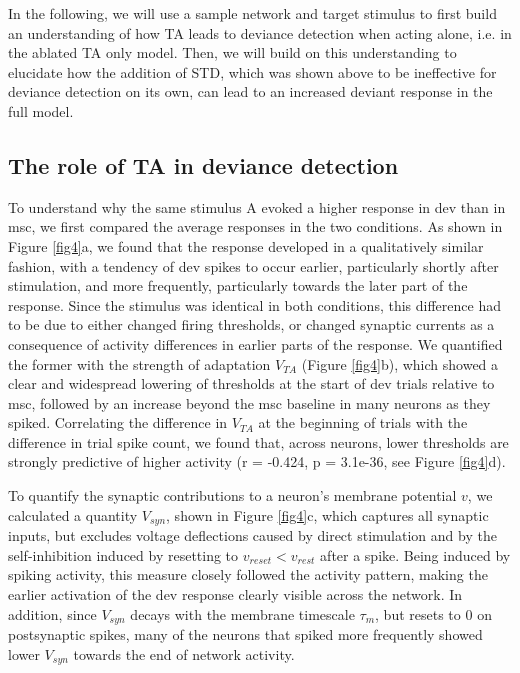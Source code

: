 \documentclass[pdflatex,referee,iicol,sn-basic]{sn-jnl}
\theoremstyle{thmstyleone}%
\theoremstyle{thmstyletwo}%
\theoremstyle{thmstylethree}%
\begin{document}
In the following, we will use a sample network and target stimulus to first build an understanding of how TA leads to deviance detection when acting alone, i.e. in the ablated TA only model. Then, we will build on this understanding to elucidate how the addition of STD, which was shown above to be ineffective for deviance detection on its own, can lead to an increased deviant response in the full model.

\subsection{The role of TA in deviance detection}\label{sec-ta}

To understand why the same stimulus A evoked a higher response in dev than in msc, we first compared the average responses in the two conditions. As shown in Figure \ref{fig4}a, we found that the response developed in a qualitatively similar fashion, with a tendency of dev spikes to occur earlier, particularly shortly after stimulation, and more frequently, particularly towards the later part of the response. Since the stimulus was identical in both conditions, this difference had to be due to either changed firing thresholds, or changed synaptic currents as a consequence of activity differences in earlier parts of the response. We quantified the former with the strength of adaptation $V_{TA}$ (Figure \ref{fig4}b), which showed a clear and widespread lowering of thresholds at the start of dev trials relative to msc, followed by an increase beyond the msc baseline in many neurons as they spiked. Correlating the difference in $V_{TA}$ at the beginning of trials with the difference in trial spike count, we found that, across neurons, lower thresholds are strongly predictive of higher activity (r = -0.424, p = 3.1e-36, see Figure \ref{fig4}d).

To quantify the synaptic contributions to a neuron's membrane potential $v$, we calculated a quantity $V_{syn}$, shown in Figure \ref{fig4}c, which captures all synaptic inputs, but excludes voltage deflections caused by direct stimulation and by the self-inhibition induced by resetting to $v_{reset} < v_{rest}$ after a spike. Being induced by spiking activity, this measure closely followed the activity pattern, making the earlier activation of the dev response clearly visible across the network. In addition, since $V_{syn}$ decays with the membrane timescale $\tau_m$, but resets to $0$ on postsynaptic spikes, many of the neurons that spiked more frequently showed lower $V_{syn}$ towards the end of network activity.
\end{document}
